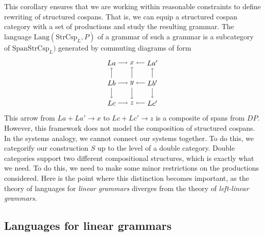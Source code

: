 \documentclass{amsart}
\newcommand{\Span}{\cat{Span}}
\newcommand{\StrCsp}{\cat{StrCsp}}
\newcommand{\Lang}{\mathrm{Lang}}
\newcommand{\cat}[1]{\mathrm{#1}}
\newcommand{\csp}[3]{#1 + #3 \to #2}
\theoremstyle{remark}
\theoremstyle{definition}
\begin{document}
This corollary ensures that we are working within reasonable
constraints to define rewriting of structured cospans. That is, we can
equip a structured cospan category with a set of productions and study
the resulting grammar. The language $ \Lang ( \StrCsp_{L} , P ) $ of a
grammar of such a grammar is a subcategory of $ \Span \StrCsp_{L}) $
generated by commuting diagrams of form
%
\[
  \begin{tikzpicture}
    \node (1) at (0,2) {\( La \)};
    \node (2) at (1,2) {\( x \)};
    \node (3) at (2,2) {\( La' \)};
    \node (4) at (0,1) {\( Lb \)};
    \node (5) at (1,1) {\( y \)};
    \node (6) at (2,1) {\( Lb' \)};
    \node (7) at (0,0) {\( Lc \)};
    \node (8) at (1,0) {\( z \)};
    \node (9) at (2,0) {\( Lc' \)};
    \draw [->] (1) to node [] {\scriptsize{\(  \)}} (2);
    \draw [->] (3) to node [] {\scriptsize{\(  \)}} (2);
    \draw [->] (4) to node [] {\scriptsize{\(  \)}} (5);
    \draw [->] (6) to node [] {\scriptsize{\(  \)}} (5);
    \draw [->] (7) to node [] {\scriptsize{\(  \)}} (8);
    \draw [->] (9) to node [] {\scriptsize{\(  \)}} (8);
    \draw [->] (4) to node [] {\scriptsize{\(  \)}} (1);
    \draw [->] (4) to node [] {\scriptsize{\(  \)}} (7);
    \draw [->] (5) to node [] {\scriptsize{\(  \)}} (2);
    \draw [->] (5) to node [] {\scriptsize{\(  \)}} (8);
    \draw [->] (6) to node [] {\scriptsize{\(  \)}} (3);
    \draw [->] (6) to node [] {\scriptsize{\(  \)}} (9); 
  \end{tikzpicture}
\]
% 
This arrow from $ \csp{La}{x}{La'}$ to $ \csp{Lc}{z}{Lc'} $ is a
composite of spans from $ DP $. However, this framework does not model
the composition of structured cospans.  In the systems analogy, we
cannot connect our systems together. To do this, we categorify our
construction $ S $ up to the level of a double category.  Double
categories support two different compositional structures, which is
exactly what we need. To do this, we need to make some minor
restrictions on the productions considered.  Here is the point where this
distinction becomes important, as the theory of languages for \emph{
  linear grammars} diverges from the theory of \emph{left-linear
  grammars}. 


\subsection{Languages for linear grammars}
\label{sec:lang-linear-grammars}
\end{document}
